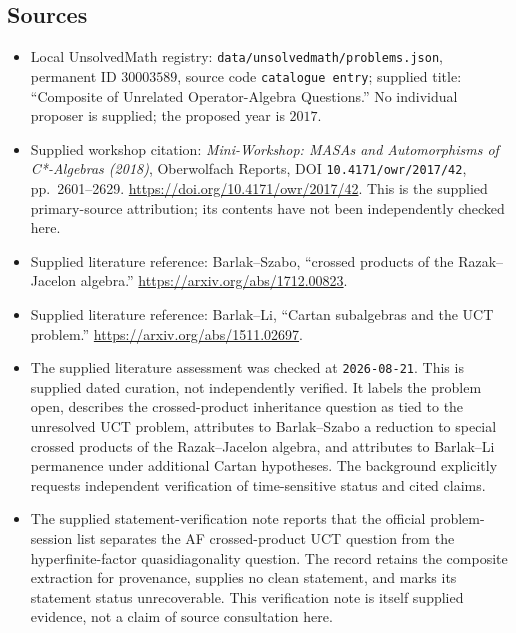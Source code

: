 \documentclass[11pt]{article}
\begin{document}
\subsection{Sources}
\begin{itemize}
\item Local UnsolvedMath registry: \texttt{data/unsolvedmath/problems.json}, permanent ID \(30003589\), source code \texttt{catalogue entry}; supplied title: ``Composite of Unrelated Operator-Algebra Questions.'' No individual proposer is supplied; the proposed year is \(2017\).
\item Supplied workshop citation: \emph{Mini-Workshop: MASAs and Automorphisms of C*-Algebras (2018)}, Oberwolfach Reports, DOI \texttt{10.4171/owr/2017/42}, pp.\ 2601--2629. \url{https://doi.org/10.4171/owr/2017/42}. This is the supplied primary-source attribution; its contents have not been independently checked here.
\item Supplied literature reference: Barlak--Szabo, ``crossed products of the Razak--Jacelon algebra.'' \url{https://arxiv.org/abs/1712.00823}.
\item Supplied literature reference: Barlak--Li, ``Cartan subalgebras and the UCT problem.'' \url{https://arxiv.org/abs/1511.02697}.
\item The supplied literature assessment was checked at \texttt{2026-08-21}. This is supplied dated curation, not independently verified. It labels the problem open, describes the crossed-product inheritance question as tied to the unresolved UCT problem, attributes to Barlak--Szabo a reduction to special crossed products of the Razak--Jacelon algebra, and attributes to Barlak--Li permanence under additional Cartan hypotheses. The background explicitly requests independent verification of time-sensitive status and cited claims.
\item The supplied statement-verification note reports that the official problem-session list separates the AF crossed-product UCT question from the hyperfinite-factor quasidiagonality question. The record retains the composite extraction for provenance, supplies no clean statement, and marks its statement status unrecoverable. This verification note is itself supplied evidence, not a claim of source consultation here.
\end{itemize}
\end{document}
